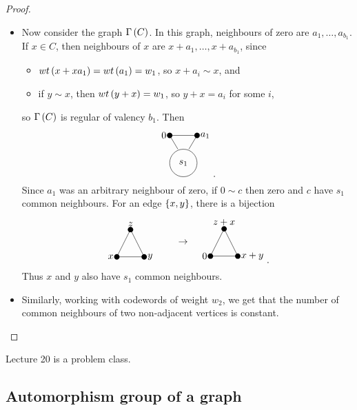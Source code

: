\begin{proof}
\begin{itemize}
\pagebreak

\item Now consider the graph $ \Gamma\br{C} $. In this graph, neighbours of zero are $ a_1, \dots, a_{b_1} $. If $ x \in C $, then neighbours of $ x $ are $ x + a_1, \dots, x + a_{b_1} $, since
\begin{itemize}
\item $ wt\br{x + xa_1} = wt\br{a_1} = w_1 $, so $ x + a_i \sim x $, and
\item if $ y \sim x $, then $ wt\br{y + x} = w_1 $, so $ y + x = a_i $ for some $ i $,
\end{itemize}
so $ \Gamma\br{C} $ is regular of valency $ b_1 $. Then
$$
\begin{tikzpicture}
\fill (0, 0) circle (0.1) node[left]{$ 0 $};
\fill (1, 0) circle (0.1) node[right]{$ a_1 $};
\draw (0.5, -1) circle (0.5) node{$ s_1 $};
\draw (0, 0) to (1, 0);
\draw (0, 0) to (0.3, -0.5);
\draw (1, 0) to (0.7, -0.5);
\end{tikzpicture}.
$$
Since $ a_1 $ was an arbitrary neighbour of zero, if $ 0 \sim c $ then zero and $ c $ have $ s_1 $ common neighbours. For an edge $ \cbr{x, y} $, there is a bijection
$$
\begin{tikzpicture}
\fill (0, 0) circle (0.1) node[above]{$ z $};
\fill (-0.5, -1) circle (0.1) node[left]{$ x $};
\fill (0.5, -1) circle (0.1) node[right]{$ y $};
\draw (0, 0) to (-0.5, -1);
\draw (0, 0) to (0.5, -1);
\draw (-0.5, -1) to (0.5, -1);
\end{tikzpicture}
\qquad
\begin{tikzpicture}
\draw (-1.5, -0.5) node{$ \to $};
\fill (0, 0) circle (0.1) node[above]{$ z + x $};
\fill (-0.5, -1) circle (0.1) node[left]{$ 0 $};
\fill (0.5, -1) circle (0.1) node[right]{$ x + y $};
\draw (0, 0) to (-0.5, -1);
\draw (0, 0) to (0.5, -1);
\draw (-0.5, -1) to (0.5, -1);
\end{tikzpicture}.
$$
Thus $ x $ and $ y $ also have $ s_1 $ common neighbours.
\item Similarly, working with codewords of weight $ w_2 $, we get that the number of common neighbours of two non-adjacent vertices is constant.
\end{itemize}
\end{proof}


Lecture 20 is a problem class.


\subsection{Automorphism group of a graph}


